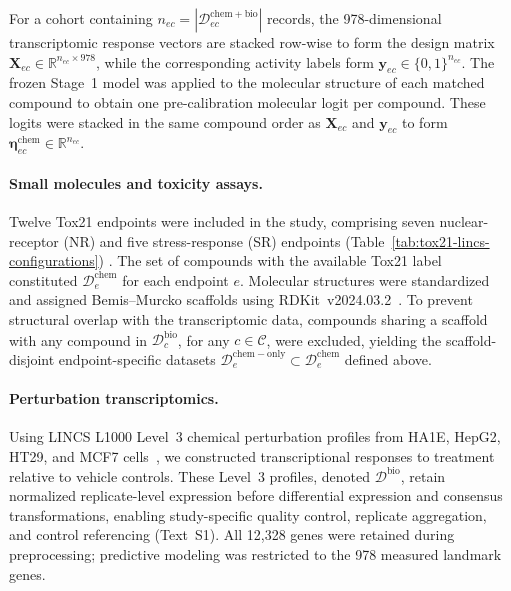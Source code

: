 \documentclass[11pt,a4paper]{article}
\begin{document}
For a cohort containing
$n_{ec}=|\mathcal D^{\mathrm{chem+bio}}_{ec}|$ records, the
978-dimensional transcriptomic response vectors are stacked row-wise to
form the design matrix
$\mathbf X_{ec}\in\mathbb R^{n_{ec}\times978}$, while the corresponding
activity labels form
$\mathbf y_{ec}\in\{0,1\}^{n_{ec}}$.
The frozen Stage~1 model was applied to the molecular structure of each
matched compound to obtain one pre-calibration molecular logit per
compound. These logits were stacked in the same compound order as
$\mathbf X_{ec}$ and $\mathbf y_{ec}$ to form
$\boldsymbol\eta^{\mathrm{chem}}_{ec}\in\mathbb R^{n_{ec}}$.

\paragraph{Small molecules and toxicity assays.}
Twelve Tox21 endpoints were included in the study, comprising seven nuclear-receptor (NR) and five stress-response (SR) endpoints
(Table~\ref{tab:tox21-lincs-configurations})
\cite{huang2016challenge}. The set of compounds
with the available Tox21 label constituted
$\mathcal D^{\mathrm{chem}}_e$ for each endpoint \(e\).
Molecular structures were standardized and assigned Bemis--Murcko
scaffolds using RDKit~v2024.03.2~\cite{landrum2024rdkit}.
To prevent structural overlap with the transcriptomic data, compounds
sharing a scaffold with any compound in
$\mathcal D^{\mathrm{bio}}_c$, for any $c\in\mathcal C$, were excluded,
yielding the scaffold-disjoint endpoint-specific datasets
$\mathcal D^{\mathrm{chem-only}}_e
\subset\mathcal D^{\mathrm{chem}}_e$ defined above.

\paragraph{Perturbation transcriptomics.}
Using LINCS L1000 Level~3 chemical perturbation profiles from HA1E,
HepG2, HT29, and MCF7 cells~\cite{subramanian2017l1000}, we constructed
transcriptional responses to treatment relative to vehicle controls. These
Level~3 profiles, denoted $\mathcal D^{\mathrm{bio}}$, retain normalized
replicate-level expression before differential expression and consensus
transformations, enabling study-specific quality control, replicate
aggregation, and control referencing (Text~S1). All 12,328 genes were retained
during preprocessing; predictive modeling was restricted to the 978 measured
landmark genes.
\end{document}
